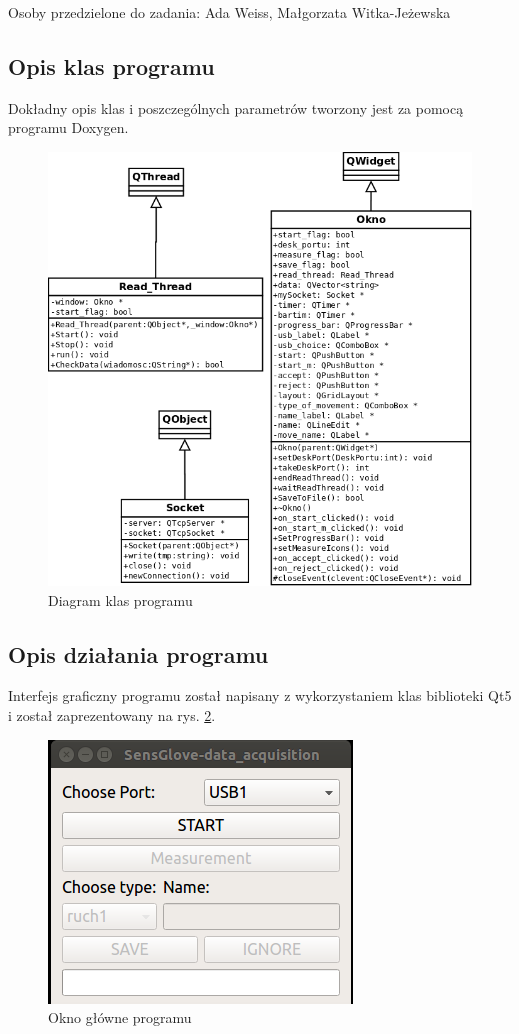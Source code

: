 \documentclass{article}
\begin{document}
Osoby przedzielone do zadania: Ada Weiss, Małgorzata Witka-Jeżewska
\subsection{Opis klas programu}
Dokładny opis klas i poszczególnych parametrów tworzony jest za pomocą programu Doxygen.
\begin{figure}[h!]
    \centering
    \includegraphics[scale=0.4]{autodia.png}
    \caption{Diagram klas programu}
    \label{rys:outodia.out}
\end{figure}

\subsection{Opis działania programu}

Interfejs graficzny programu został napisany z wykorzystaniem klas biblioteki Qt5 i został zaprezentowany na rys. \ref{rys:okno}. 
\begin{figure}[h!]
    \centering
    \includegraphics[scale=0.6]{okno.png}
    \caption{Okno główne programu}
    \label{rys:okno}
\end{figure}
\end{document}

